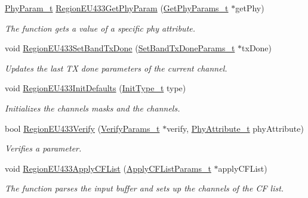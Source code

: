 \begin{DoxyCompactItemize}
\item 
\hyperlink{group__REGION_gaed159b26e5c4677236b6e8677019db30}{Phy\+Param\+\_\+t} \hyperlink{group__REGIONEU433_ga407d34fe6c7dea18b07732d03b62894b}{Region\+E\+U433\+Get\+Phy\+Param} (\hyperlink{group__REGION_gab471483fff904f4f89bbc03f7fc380ab}{Get\+Phy\+Params\+\_\+t} $\ast$get\+Phy)
\begin{DoxyCompactList}\small\item\em The function gets a value of a specific phy attribute. \end{DoxyCompactList}\item 
void \hyperlink{group__REGIONEU433_gae044b69c6a72fff53e322ba8ffbc9be5}{Region\+E\+U433\+Set\+Band\+Tx\+Done} (\hyperlink{group__REGION_gad0524aa0673c0814a71e7a4f9cade3fc}{Set\+Band\+Tx\+Done\+Params\+\_\+t} $\ast$tx\+Done)
\begin{DoxyCompactList}\small\item\em Updates the last TX done parameters of the current channel. \end{DoxyCompactList}\item 
void \hyperlink{group__REGIONEU433_ga1961913d7b9857e1804f455b59428186}{Region\+E\+U433\+Init\+Defaults} (\hyperlink{group__REGION_gaddc73ae10673ec925724e7870363bda9}{Init\+Type\+\_\+t} type)
\begin{DoxyCompactList}\small\item\em Initializes the channels masks and the channels. \end{DoxyCompactList}\item 
bool \hyperlink{group__REGIONEU433_ga6ffa44f79bf438495ab15476274e88dd}{Region\+E\+U433\+Verify} (\hyperlink{group__REGION_ga966d97bc2f25df1c09e92e60ef652276}{Verify\+Params\+\_\+t} $\ast$verify, \hyperlink{group__REGION_ga9445b07fdf77581ecfaf389970e635f8}{Phy\+Attribute\+\_\+t} phy\+Attribute)
\begin{DoxyCompactList}\small\item\em Verifies a parameter. \end{DoxyCompactList}\item 
void \hyperlink{group__REGIONEU433_gacf5995b949053267e507f4e2063fc7bf}{Region\+E\+U433\+Apply\+C\+F\+List} (\hyperlink{group__REGION_ga71588e9ad07e34b78fa91d51881fd3c6}{Apply\+C\+F\+List\+Params\+\_\+t} $\ast$apply\+C\+F\+List)
\begin{DoxyCompactList}\small\item\em The function parses the input buffer and sets up the channels of the CF list. \end{DoxyCompactList}\item 

\end{DoxyCompactItemize}
